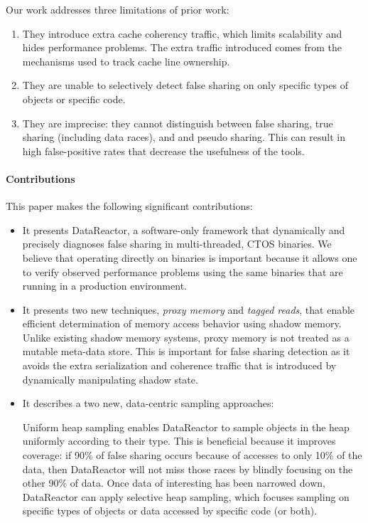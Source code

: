 \documentclass{sig-alternate}
\newcommand{\Toolname}{DataReactor}
\begin{document}
Our work addresses three limitations of prior work:
\begin{enumerate}
\item They introduce extra cache coherency traffic, which limits scalability and hides performance
problems. The extra traffic introduced comes from the mechanisms used to track cache line ownership.

\item They are unable to selectively detect false sharing on only specific types of objects or specific
code.

\item They are imprecise: they cannot distinguish between false sharing, true sharing (including
data races), and and pseudo sharing. This can result in high false-positive rates that decrease the
usefulness of the tools.

\end{enumerate}

\paragraph{Contributions}
This paper makes the following significant contributions:
\begin{itemize}
\item It presents \Toolname{}, a software-only framework that dynamically and precisely diagnoses
false sharing  in multi-threaded, CTOS binaries. We believe that operating directly on binaries is
important because it allows one to verify observed performance problems using the same binaries
that are running in a production environment.

\item It presents two new techniques, \emph{proxy memory} and \emph{tagged reads}, that enable
efficient determination of memory access behavior using shadow memory. Unlike existing shadow
memory systems, proxy memory is not treated as a mutable meta-data store. This is important
for false sharing detection as it avoids the extra serialization and coherence traffic that is introduced
by dynamically manipulating shadow state.

\item It describes a two new, data-centric sampling approaches:  Uniform heap sampling enables \Toolname{} to sample objects in the heap uniformly
according to their type. This is beneficial because it improves coverage: if 90\% of false sharing occurs because
of accesses to only 10\% of the data, then \Toolname{} will not miss those races by blindly focusing on the
other 90\% of data. Once data of interesting has been narrowed down, \Toolname{} can apply selective heap
sampling, which focuses sampling on specific types of objects or data accessed by specific code (or both).
\end{itemize}
\end{document}
